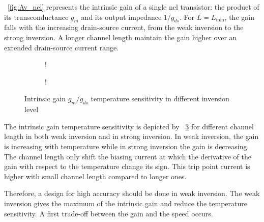 \figurename~\ref{fig:Av_nel} represents the intrinsic gain of a single nel transistor: the product of its transconductance \(g_m \) and its output impedance \(1/g_{ds} \). For \(L = L_{\min} \), the gain falls with the increasing drain-source current, from the weak inversion to the strong inversion. A longer channel length maintain the gain higher over an extended drain-source current range.

\begin{figure}[!ht]
    \centering
    \begin{subfigure}[b]{0.48\textwidth}
        \resizebox {\textwidth} {!} { 
            
        }
        \label{fig:Av_nel_sensitivity_wi}
    \end{subfigure}
    \begin{subfigure}[b]{0.48\textwidth}
        \resizebox {\textwidth} {!} { 
            
        }
        \label{fig:Av_nel_sensitivity_si}
    \end{subfigure}
    \caption{Intrinsic gain \(g_m/g_{ds} \) temperature sensitivity in different inversion level}
    \label{fig:sAv_nel}
\end{figure}

The intrinsic gain temperature sensitivity is depicted by \figurename~\ref{fig:sAv_nel} for different channel length in both weak inversion and in strong inversion. In weak inversion, the gain is increasing with temperature while in strong inversion the gain is decreasing. The channel length only shift the biasing current at which the derivative of the gain with respect to the temperature change its sign. This trip point current is higher with small channel length compared to longer ones.

Therefore, a design for high accuracy should be done in weak inversion. The weak inversion gives the maximum of the intrinsic gain and reduce the temperature sensitivity. A first trade-off between the gain and the speed occurs.

